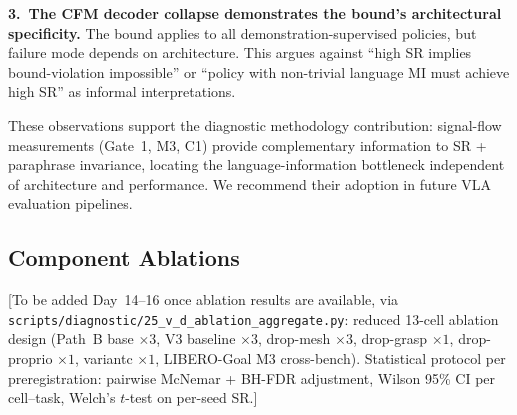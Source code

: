 \textbf{3.~The CFM decoder collapse demonstrates the bound's architectural specificity.}
The bound applies to all demonstration-supervised policies, but failure mode depends on
architecture. This argues against ``high SR implies bound-violation impossible'' or
``policy with non-trivial language MI must achieve high SR'' as informal
interpretations.

These observations support the diagnostic methodology contribution: signal-flow
measurements (Gate~1, M3, C1) provide complementary information to SR + paraphrase
invariance, locating the language-information bottleneck independent of architecture and
performance. We recommend their adoption in future VLA evaluation pipelines.

\subsection{Component Ablations}
\label{sec:results:component_ablations}


[To be added Day~14--16 once ablation results are available, via
\texttt{scripts/diagnostic/25\_v\_d\_ablation\_aggregate.py}: reduced 13-cell ablation
design (Path~B base $\times 3$, V3 baseline $\times 3$, drop-mesh $\times 3$,
drop-grasp $\times 1$, drop-proprio $\times 1$, variantc $\times 1$, LIBERO-Goal M3
cross-bench). Statistical protocol per preregistration: pairwise McNemar + BH-FDR
adjustment, Wilson 95\% CI per cell--task, Welch's $t$-test on per-seed SR.]
